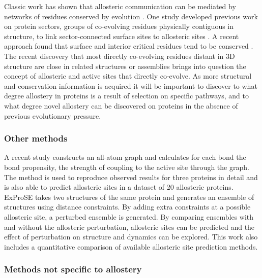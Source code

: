 Classic work has shown that allosteric communication can be mediated by networks of residues conserved by evolution \cite{Lockless1999, Suel2003}.
One study developed previous work on protein sectors, groups of co-evolving residues physically contiguous in structure, to link sector-connected surface sites to allosteric sites \cite{Reynolds2011}.
A recent approach found that surface and interior critical residues tend to be conserved \cite{Clarke2016}.
The recent discovery that most directly co-evolving residues distant in 3D structure are close in related structures or assemblies \cite{Anishchenko2017} brings into question the concept of allosteric and active sites that directly co-evolve.
As more structural and conservation information is acquired it will be important to discover to what degree allostery in proteins is a result of selection on specific pathways, and to what degree novel allostery can be discovered on proteins in the absence of previous evolutionary pressure.


\subsubsection{Other methods}

A recent study \cite{Amor2016} constructs an all-atom graph and calculates for each bond the bond propensity, the strength of coupling to the active site through the graph.
The method is used to reproduce observed results for three proteins in detail and is also able to predict allosteric sites in a dataset of 20 allosteric proteins.
ExProSE \cite{Greener2017} takes two structures of the same protein and generates an ensemble of structures using distance constraints.
By adding extra constraints at a possible allosteric site, a perturbed ensemble is generated.
By comparing ensembles with and without the allosteric perturbation, allosteric sites can be predicted and the effect of perturbation on structure and dynamics can be explored.
This work also includes a quantitative comparison of available allosteric site prediction methods.


\subsubsection{Methods not specific to allostery}

